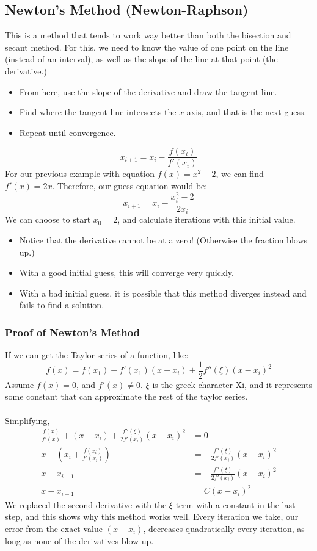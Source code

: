 \documentclass[10pt]{article}
\begin{document}
\subsection*{Newton's Method (Newton-Raphson)}
This is a method that tends to work way better than both the bisection and secant method.  For this, we need to know the value of one point on the line (instead of an interval), as well as the slope of the line at that point (the derivative.)
\begin{itemize}
	\item From here, use the slope of the derivative and draw the tangent line.
	\item Find where the tangent line intersects the $x$-axis, and that is the next guess.
	\item Repeat until convergence.
\end{itemize}
\[x_{i + 1} = x_i - \frac{f(x_i)}{f'(x_i)}\]
For our previous example with equation $f(x) = x^2 - 2$, we can find $f'(x) = 2x$.  Therefore, our guess equation would be:
\[x_{i + 1} = x_i - \frac{x_i^2 - 2}{2x_i}\]
We can choose to start $x_0 = 2$, and calculate iterations with this initial value.
\begin{itemize}
	\item Notice that the derivative cannot be at a zero!  (Otherwise the fraction blows up.)
	\item With a good initial guess, this will converge very quickly.
	\item With a bad initial guess, it is possible that this method diverges instead and fails to find a solution.
\end{itemize}

\subsubsection*{Proof of Newton's Method}
If we can get the Taylor series of a function, like:
\[f(x) = f(x_1) + f'(x_1)(x - x_i) + \frac{1}{2}f''(\xi) (x - x_i)^2\]
Assume $f(x) = 0$, and $f'(x) \neq 0$.  $\xi$ is the greek character Xi, and it represents some constant that can approximate the rest of the taylor series.\\\\
Simplifying,
\begin{align*}
    \frac{f(x)}{f'(x)} + (x - x_i) + \frac{f''(\xi)}{2f'(x_i)}(x - x_i)^2 &= 0\\
    x - \left(x_i + \frac{f(x_i)}{f'(x_i)}\right) &= -\frac{f''(\xi)}{2f'(x_i)}(x - x_i)^2\\
    x - x_{i + 1} &= -\frac{f''(\xi)}{2f'(x_i)}(x - x_i)^2\\
    x - x_{i + 1} &= C (x - x_i)^2
\end{align*}
We replaced the second derivative with the $\xi$ term with a constant in the last step, and this shows why this method works well.  Every iteration we take, our error from the exact value $(x - x_i)$, decreases quadratically every iteration, as long as none of the derivatives blow up.
\end{document}
